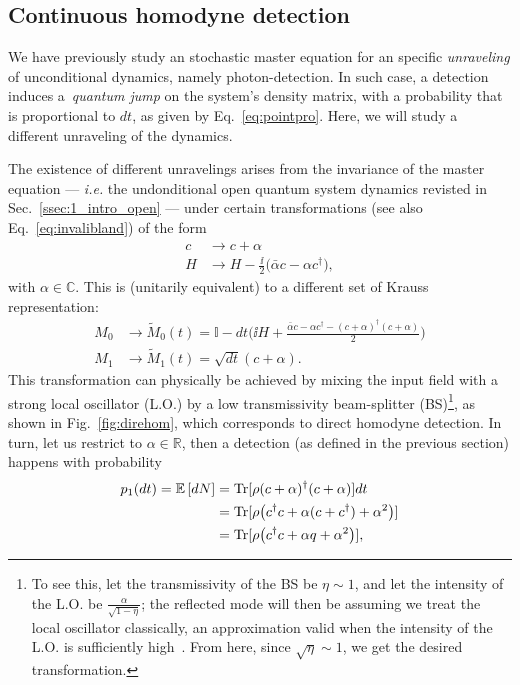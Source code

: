 \subsection{Continuous homodyne detection}\label{ssec:1_cmon_homodyne}
We have previously study an stochastic master equation for an specific \textit{unraveling} of unconditional dynamics, namely photon-detection. In such case, a detection induces a \textit{quantum jump} on the system's density matrix, with a probability that is proportional to $dt$, as given by Eq.~\ref{eq:pointpro}. Here, we will study a different unraveling of the dynamics.

The existence of different unravelings arises from the invariance of the master equation --- \textit{i.e.} the undonditional open quantum system dynamics revisted in Sec.~\ref{ssec:1_intro_open} --- under certain transformations (see also Eq.~\ref{eq:invalibland}) of the form
\begin{align}
c &\rightarrow c + \alpha \\
H &\rightarrow H - \frac{\ii}{2}\big(\bar{\alpha}c - \alpha c^\dagger),
\end{align}
with $\alpha \in \mathbb{C}$. This is (unitarily equivalent) to a different set of Krauss representation:
\begin{align}\label{eq:homPOM}
M_0 &\rightarrow\tilde{M}_0(t) = \mathbb{I} - dt\Big(\ii H + \frac{\bar{\alpha}c - \alpha c^\dagger - (c+\alpha)^\dagger(c+\alpha)}{2}\Big) \\
M_1  &\rightarrow \tilde{M}_1(t) = \sqrt{dt}(c+\alpha).
\end{align}
This transformation can physically be achieved by mixing the input field with a strong local oscillator (L.O.) by a low transmissivity beam-splitter (BS)\footnote{To see this, let the transmissivity of the BS be $\eta\sim1$, and let the intensity of the L.O. be $\frac{\alpha}{\sqrt{1-\eta}}$; the reflected mode will then be assuming we treat the local oscillator classically, an approximation valid when the intensity of the L.O. is sufficiently high~\cite{serafiniBOOK}. From here, since $\sqrt{\eta}\sim1$, we get the desired transformation.}, as shown in Fig.~\ref{fig:direhom}, which corresponds to direct homodyne detection. In turn, let us restrict to $\alpha\in\mathbb{R}$, then a detection (as defined in the previous section) happens with probability
\begin{align}
p_1(dt) = \mathbb{E}\left[ dN\right] &= \text{Tr}[\rho (c+\alpha)^\dagger(c+\alpha)] dt \\
&= \text{Tr}[\rho \big(c^\dagger c + \alpha (c+c^\dagger) + \alpha^2\big)]\\
&= \text{Tr}[\rho \big(c^\dagger c +  \alpha q + \alpha^2\big)],
\end{align}

